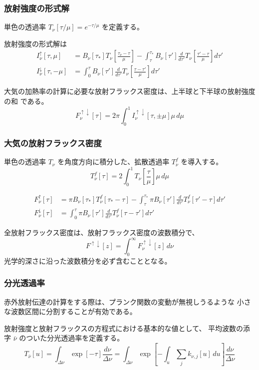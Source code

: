 \documentclass[unicode,colorlinks]{beamer}
\begin{document}
\begin{frame}
	\frametitle{放射強度の形式解}
	単色の透過率 $T_\nu[\tau/\mu]=e^{-\tau/\mu}$ を定義する。

	放射強度の形式解は
	\begin{align*}
		I^\uparrow_\nu[\tau,\mu]
			&=B_\nu[\tau_*]T_\nu\left[\frac{\tau_\nu-\tau}{\mu}\right]
			-\int^{\tau_*}_\tau B_\nu[\tau']\frac{d}{d\tau'}T_\nu\left[\frac{\tau'-\tau}{\mu}\right]d\tau'\\
		I^\downarrow_\nu[\tau,-\mu]
			&=\int^\tau_0 B_\nu[\tau']\frac{d}{d\tau'}T_\nu\left[\frac{\tau-\tau'}{\mu}\right]d\tau'
	\end{align*}

	大気の加熱率の計算に必要な放射フラックス密度は、上半球と下半球の放射強度の和
	である。
	\[F^{\uparrow\downarrow}_\nu[\tau]=2\pi\int^1_0 I^{\uparrow\downarrow}_\nu[\tau,\pm\mu]\mu\,d\mu\]
\end{frame}

\begin{frame}
	\frametitle{大気の放射フラックス密度}
	単色の透過率 $T_\nu$ を角度方向に積分した、拡散透過率 $T^f_\nu$ を導入する。
	\[T^f_\nu[\tau]=2\int^1_0 T_\nu\left[\frac{\tau}{\mu}\right]\mu\,d\mu\]

	\begin{align*}
		F^\uparrow_\nu[\tau]
			&=\pi B_\nu[\tau_*]T^f_\nu[\tau_*-\tau]
			-\int^{\tau_*}_\tau \pi B_\nu[\tau']\frac{d}{d\tau'}T^f_\nu[\tau'-\tau]d\tau'\\
		F^\downarrow_\nu[\tau]
			&=\int^\tau_0 \pi B_\nu[\tau']\frac{d}{d\tau'}T^f_\nu[\tau-\tau']d\tau'
	\end{align*}

	全放射フラックス密度は、放射フラックス密度の波数積分で、
	\[F^{\uparrow\downarrow}[z]=\int^\infty_0 F^{\uparrow\downarrow}_\nu[z]\,d\nu\]
	光学的深さに沿った波数積分を必ず含むこととなる。
\end{frame}

% 

\begin{frame}
	\frametitle{分光透過率}
	赤外放射伝達の計算をする際は、プランク関数の変動が無視しうるような
	小さな波数区間に分割することが有効である。

	放射強度と放射フラックスの方程式における基本的な値として、
	平均波数の添字 $\bar\nu$ のついた分光透過率を定義する。
	\[
		T_{\bar\nu}[u]
		=\int_{\Delta\nu}\exp[-\tau]\frac{d\nu}{\Delta\nu}
		=\int_{\Delta\nu}\exp\left[-\int_u\sum_j k_{\nu,j}[u]\,du\right]\frac{d\nu}{\Delta\nu}
	\]
\end{frame}
\end{document}
